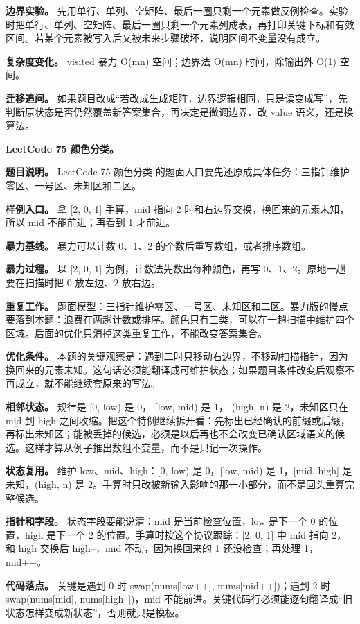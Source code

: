 \textbf{边界实验。} 先用单行、单列、空矩阵、最后一圈只剩一个元素做反例检查。实验时把单行、单列、空矩阵、最后一圈只剩一个元素列成表，再打印关键下标和有效区间。若某个元素被写入后又被未来步骤破坏，说明区间不变量没有成立。

\textbf{复杂度变化。} visited 暴力 O(mn) 空间；边界法 O(mn) 时间，除输出外 O(1) 空间。

\textbf{迁移追问。} 如果题目改成“若改成生成矩阵，边界逻辑相同，只是读变成写”，先判断原状态是否仍然覆盖新答案集合，再决定是微调边界、改 value 语义，还是换算法。

\noindent\textbf{LeetCode 75 颜色分类。}

\textbf{题目说明。} LeetCode 75 颜色分类 的题面入口要先还原成具体任务：三指针维护零区、一号区、未知区和二区。

\textbf{样例入口。} 拿 [2, 0, 1] 手算，mid 指向 2 时和右边界交换，换回来的元素未知，所以 mid 不能前进；再看到 1 才前进。

\textbf{暴力基线。} 暴力可以计数 0、1、2 的个数后重写数组，或者排序数组。

\textbf{暴力过程。} 以 [2, 0, 1] 为例，计数法先数出每种颜色，再写 0、1、2。原地一趟要在扫描时把 0 放左边、2 放右边。

\textbf{重复工作。} 题面模型：三指针维护零区、一号区、未知区和二区。暴力版的慢点要落到本题：浪费在两趟计数或排序。颜色只有三类，可以在一趟扫描中维护四个区域。后面的优化只消掉这类重复工作，不能改变答案集合。

\textbf{优化条件。} 本题的关键观察是：遇到二时只移动右边界，不移动扫描指针，因为换回来的元素未知。这句话必须能翻译成可维护状态；如果题目条件改变后观察不再成立，就不能继续套原来的写法。

\textbf{相邻状态。} 规律是 [0, low) 是 0， [low, mid) 是 1， (high, n) 是 2，未知区只在 mid 到 high 之间收缩。把这个特例继续拆开看：先标出已经确认的前缀或后缀，再标出未知区；能被丢掉的候选，必须是以后再也不会改变已确认区域语义的候选。这样才算从例子推出数组不变量，而不是只记一次操作。

\textbf{状态复用。} 维护 low、mid、high：[0, low) 是 0，[low, mid) 是 1，[mid, high] 是未知，(high, n) 是 2。手算时只改被新输入影响的那一小部分，而不是回头重算完整候选。

\textbf{指针和字段。} 状态字段要能说清：mid 是当前检查位置，low 是下一个 0 的位置，high 是下一个 2 的位置。手算时按这个协议跟踪：[2, 0, 1] 中 mid 指向 2，和 high 交换后 high--，mid 不动，因为换回来的 1 还没检查；再处理 1，mid++。

\textbf{代码落点。} 关键是遇到 0 时 swap(nums[low++], nums[mid++])；遇到 2 时 swap(nums[mid], nums[high--])，mid 不能前进。关键代码行必须能逐句翻译成“旧状态怎样变成新状态”，否则就只是模板。

